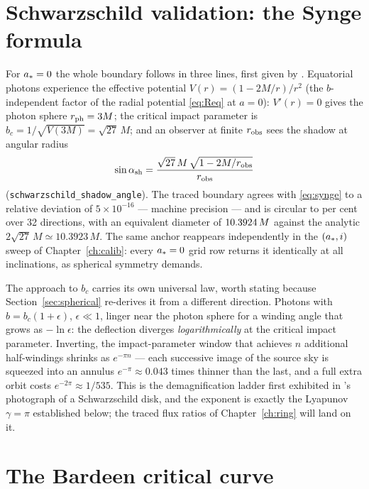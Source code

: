 \section{Schwarzschild validation: the Synge formula}
\label{sec:synge}

For $a_* = 0$ the whole boundary follows in three lines, first given
by \citet{Synge1966}. Equatorial photons experience the effective
potential $V(r) = (1 - 2M/r)/r^2$ (the $b$-independent factor of the
radial potential \eqref{eq:Req} at $a=0$): $V'(r) = 0$ gives the photon
sphere $r_{\rm ph} = 3M$; the critical impact parameter is
$b_c = 1/\sqrt{V(3M)} = \sqrt{27}\,M$; and an observer at finite
$r_{\rm obs}$ sees the shadow at angular radius
\begin{equation}
\sin\alpha_{\rm sh} = \frac{\sqrt{27}\,M\,\sqrt{1 - 2M/r_{\rm obs}}}
{r_{\rm obs}}
\label{eq:synge}
\end{equation}
(\texttt{schwarzschild\_shadow\_angle}). The traced boundary agrees with
\eqref{eq:synge} to a relative deviation of $5\times10^{-16}$ — machine
precision — and is circular to \SchwSpreadPct{} per cent over 32
directions, with an equivalent diameter of $10.3924\,M$ against the
analytic $2\sqrt{27}\,M \simeq 10.3923\,M$. The same anchor reappears
independently in the $(a_*, i)$ sweep of Chapter~\ref{ch:calib}:
every $a_* = 0$ grid row returns it identically at all inclinations,
as spherical symmetry demands.

The approach to $b_c$ carries its own universal law, worth stating
because Section~\ref{sec:spherical} re-derives it from a different
direction. Photons with $b = b_c(1 + \epsilon)$, $\epsilon \ll 1$,
linger near the photon sphere for a winding angle that grows as
$-\ln\epsilon$: the deflection diverges \emph{logarithmically} at the
critical impact parameter. Inverting, the impact-parameter window that
achieves $n$ additional half-windings shrinks as $e^{-\pi n}$ — each
successive image of the source sky is squeezed into an annulus
$e^{-\pi} \approx 0.043$ times thinner than the last, and a full extra
orbit costs $e^{-2\pi} \approx 1/535$. This is the demagnification
ladder first exhibited in \citet{Luminet1979}'s photograph of a
Schwarzschild disk, and the exponent is exactly the Lyapunov
$\gamma = \pi$ established below; the traced flux ratios of
Chapter~\ref{ch:ring} will land on it.

\section{The Bardeen critical curve}
\label{sec:bardeen}

